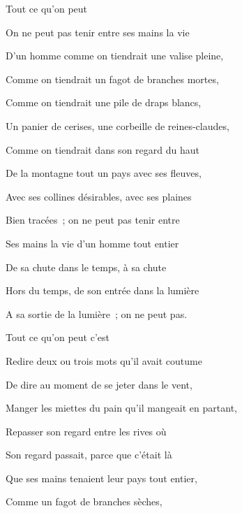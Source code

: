 {\vspace{-12pt}
\begin{center}
Tout ce qu'on peut
\end{center}
\setlength{\parskip}{0pt}

\medskip

On ne peut pas tenir entre ses mains la vie

D'un homme comme on tiendrait une valise pleine,

Comme on tiendrait un fagot de branches mortes,

Comme on tiendrait une pile de draps blancs,

Un panier de cerises, une corbeille de reines-claudes,

Comme on tiendrait dans son regard du haut

De la montagne tout un pays avec ses fleuves,

Avec ses collines désirables, avec ses plaines

Bien tracées~; on ne peut pas tenir entre

Ses mains la vie d'un homme tout entier

De sa chute dans le temps, à sa chute

Hors du temps, de son entrée dans la lumière

A sa sortie de la lumière~; on ne peut pas.

Tout ce qu'on peut c'est

Redire deux ou trois mots qu'il avait coutume

De dire au moment de se jeter dans le vent,

Manger les miettes du pain qu'il mangeait en partant,

Repasser son regard entre les rives où

Son regard passait, parce que c'était là

Que ses mains tenaient leur pays tout entier,

Comme un fagot de branches sèches,

}
